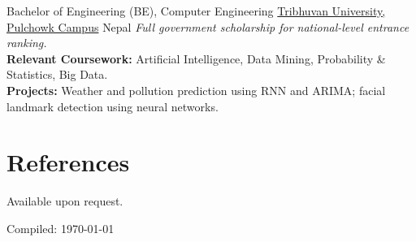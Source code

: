 \documentclass[11pt,a4paper,sans]{moderncv}
\begin{document}
{Bachelor of Engineering (BE), Computer Engineering}
{\href{https://pcampus.edu.np/}{Tribhuvan University, Pulchowk Campus}}
{Nepal}
{}
{
\textit{Full government scholarship for national-level entrance ranking.}\\
\textbf{Relevant Coursework:} Artificial Intelligence, Data Mining, Probability \& Statistics, Big Data.\\
\textbf{Projects:} Weather and pollution prediction using RNN and ARIMA; facial landmark detection using neural networks.
}


\section{References}
Available upon request.

\vfill
\begin{flushright}
{\footnotesize Compiled: \today}
\end{flushright}
\end{document}
